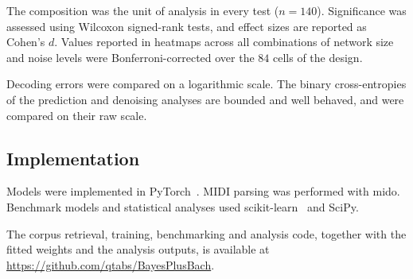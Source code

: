     The composition was the unit of analysis in every test ($n = 140$). Significance was assessed using Wilcoxon signed-rank tests, and effect sizes are reported as Cohen's $d$. Values reported in heatmaps across all combinations of network size and noise levels were Bonferroni-corrected over the $84$ cells of the design.

    Decoding errors were compared on a logarithmic scale. The binary cross-entropies of the prediction and denoising analyses are bounded and well behaved, and were compared on their raw scale.

  \subsection*{Implementation}

    Models were implemented in PyTorch~\cite{paszke2019pytorch}. MIDI parsing was performed with mido. Benchmark models and statistical analyses used scikit-learn~\cite{pedregosa2011sklearn} and SciPy.

    The corpus retrieval, training, benchmarking and analysis code, together with the fitted weights and the analysis outputs, is available at \url{https://github.com/qtabs/BayesPlusBach}.
